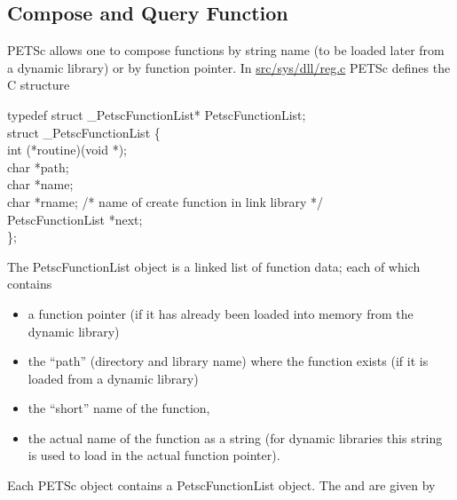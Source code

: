 \documentclass[twoside,12pt]{../sty/report_petsc}
\begin{document}
\subsection{Compose and Query Function}

PETSc allows one to compose functions by string name (to be loaded later from
a dynamic library) or by function pointer. In \href{http://www.mcs.anl.gov/petsc/petsc-dev/src/sys/dll/reg.c.html}{src/sys/dll/reg.c}
PETSc defines the C structure

\begin{tabbing}
typedef struct \_PetscFunctionList* PetscFunctionList;\\
struct \_PetscFunctionList \{\\
  int    (*routine)(void *);\\
  char   *path;\\
  char   *name;  \\
  char   *rname;            /* name of create function in link library */\\
  PetscFunctionList  *next;\\
\};
\end{tabbing}

The PetscFunctionList object is a linked list of function data; each
of which contains
\begin{itemize}
\item a function pointer (if it has already been loaded into memory from the dynamic library)
\item the ``path'' (directory and library name) where the function exists (if it is
      loaded from a dynamic library)
\item the ``short'' name of the function,
\item the actual name of the function as a string (for dynamic libraries this string is used
      to load in the actual function pointer).
\end{itemize}

Each PETSc object contains a PetscFunctionList object. The  and
 are given by
\end{document}
